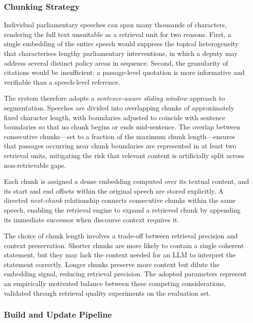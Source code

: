 \subsubsection{Chunking Strategy}

Individual parliamentary speeches can span many thousands of characters, rendering the full
text unsuitable as a retrieval unit for two reasons. First, a single embedding of the
entire speech would suppress the topical heterogeneity that characterises lengthy
parliamentary interventions, in which a deputy may address several distinct policy areas in
sequence. Second, the granularity of citations would be insufficient: a passage-level
quotation is more informative and verifiable than a speech-level reference.

The system therefore adopts a \textit{sentence-aware sliding window} approach to
segmentation. Speeches are divided into overlapping chunks of approximately fixed character
length, with boundaries adjusted to coincide with sentence boundaries so that no chunk
begins or ends mid-sentence. The overlap between consecutive chunks---set to a fraction of
the maximum chunk length---ensures that passages occurring near chunk boundaries are
represented in at least two retrieval units, mitigating the risk that relevant content is
artificially split across non-retrievable gaps.

Each chunk is assigned a dense embedding computed over its textual content, and its
start and end offsets within the original speech are stored explicitly. A directed
\textit{next-chunk} relationship connects consecutive chunks within the same speech,
enabling the retrieval engine to expand a retrieved chunk by appending its immediate
successor when discourse context requires it.

The choice of chunk length involves a trade-off between retrieval precision and context
preservation. Shorter chunks are more likely to contain a single coherent statement, but
they may lack the context needed for an LLM to interpret the statement correctly.
Longer chunks preserve more context but dilute the embedding signal, reducing retrieval
precision. The adopted parameters represent an empirically motivated balance between these
competing considerations, validated through retrieval quality experiments on the
evaluation set.

\subsubsection{Build and Update Pipeline}

